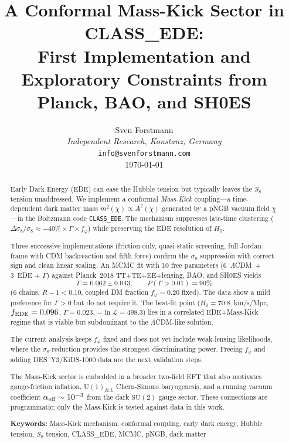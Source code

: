 \documentclass[a4paper,11pt]{article}
\newcommand{\LCDM}{$\Lambda$CDM}
\newcommand{\chif}{\chi}
\newcommand{\fphi}{f_\varphi}
\newcommand{\UBL}{\mathrm{U}(1)_{B\text{-}L}}
\newcommand{\SUt}{\mathrm{SU}(2)}
\begin{document}
\title{\textbf{A Conformal Mass-Kick Sector in CLASS\_EDE:\\[4pt] First Implementation and Exploratory Constraints from Planck, BAO, and SH0ES}}

\author{Sven Forstmann\\[4pt]
\textit{Independent Research, Konstanz, Germany} \\
\texttt{info@svenforstmann.com} \\[8pt]
\today}

\date{}
\maketitle

\begin{abstract}
Early Dark Energy (EDE) can ease the Hubble tension but typically leaves the $S_8$ tension unaddressed. We implement a conformal \textit{Mass-Kick} coupling---a time-dependent dark matter mass $m^2(\chif) \propto A^2(\chif)$ generated by a pNGB vacuum field $\chif$---in the Boltzmann code \texttt{CLASS\_EDE}. The mechanism suppresses late-time clustering ($\Delta\sigma_8/\sigma_8 \approx -40\% \times \Gamma \times \fphi$) while preserving the EDE resolution of $H_0$.

Three successive implementations (friction-only, quasi-static screening, full Jordan-frame with CDM backreaction and fifth force) confirm the $\sigma_8$ suppression with correct sign and clean linear scaling. An MCMC fit with 10 free parameters (6~\LCDM\ $+$ 3~EDE $+$ $\Gamma$) against Planck~2018 TT$+$TE$+$EE$+$lensing, BAO, and SH0ES yields
\begin{equation*}
\Gamma = 0.062 \pm 0.043, \qquad P(\Gamma > 0.01) = 90\%
\end{equation*}
(6 chains, $R-1 < 0.10$, coupled DM fraction $\fphi = 0.20$ fixed). The data show a mild preference for $\Gamma > 0$ but do not require it. The best-fit point ($H_0 = 70.8$~km/s/Mpc, $f_{\rm EDE} = 0.096$, $\Gamma = 0.023$, $-\ln\mathcal{L} = 498.3$) lies in a correlated EDE$+$Mass-Kick regime that is viable but subdominant to the \LCDM-like solution.

The current analysis keeps $\fphi$ fixed and does not yet include weak-lensing likelihoods, where the $\sigma_8$-reduction provides the strongest discriminating power. Freeing $\fphi$ and adding DES~Y3/KiDS-1000 data are the next validation steps.

The Mass-Kick sector is embedded in a broader two-field EFT that also motivates gauge-friction inflation, $\UBL$ Chern-Simons baryogenesis, and a running vacuum coefficient $\alpha_{\rm eff} \sim 10^{-3}$ from the dark $\SUt$ gauge sector. These connections are programmatic; only the Mass-Kick is tested against data in this work.

\medskip
\noindent\textbf{Keywords:} Mass-Kick mechanism, conformal coupling, early dark energy, Hubble tension, $S_8$ tension, CLASS\_EDE, MCMC, pNGB, dark matter
\end{abstract}
\end{document}
